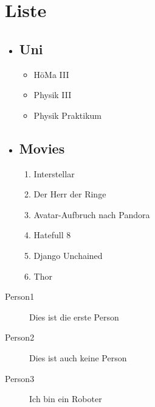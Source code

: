 \section{Liste}
\begin{itemize}
  \item \subsection{Uni}
  \begin{itemize}
    \item HöMa III
    \item Physik III
    \item Physik Praktikum
  \end{itemize}
  \item \subsection{Movies}
  \begin{enumerate}
    \item Interstellar
    \item Der Herr der Ringe
    \item Avatar-Aufbruch nach Pandora
    \item Hatefull 8
    \item Django Unchained
    \item Thor
  \end{enumerate}
\end{itemize}

\begin{description}
  \item[Person1] Dies ist die erste Person
  \item[Person2] Dies ist auch keine Person
  \item[Person3] Ich bin ein Roboter
\end{description}
